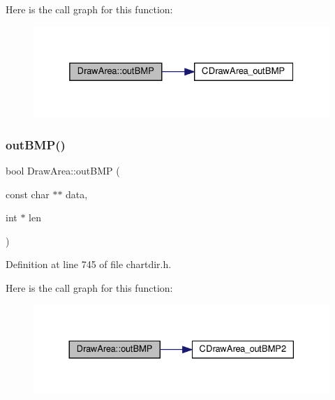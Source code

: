 Here is the call graph for this function\+:
\nopagebreak
\begin{figure}[H]
\begin{center}
\leavevmode
\includegraphics[width=325pt]{class_draw_area_aa1a273e311c36f86f78943cc1d3ffff9_cgraph}
\end{center}
\end{figure}
\mbox{\label{class_draw_area_a1c3683131dd5a006465085c3462ea868}} 
\subsubsection{\texorpdfstring{out\+B\+M\+P()}{outBMP()}\hspace{0.1cm}{\footnotesize\ttfamily [2/3]}}
{\footnotesize\ttfamily bool Draw\+Area\+::out\+B\+MP (\begin{DoxyParamCaption}\item[{const char $\ast$$\ast$}]{data,  }\item[{int $\ast$}]{len }\end{DoxyParamCaption})\hspace{0.3cm}{\ttfamily [inline]}}



Definition at line 745 of file chartdir.\+h.

Here is the call graph for this function\+:
\nopagebreak
\begin{figure}[H]
\begin{center}
\leavevmode
\includegraphics[width=330pt]{class_draw_area_a1c3683131dd5a006465085c3462ea868_cgraph}
\end{center}
\end{figure}
\mbox{\label{class_draw_area_a81a003692f54e0460aeee1b14f8e080e}} 
